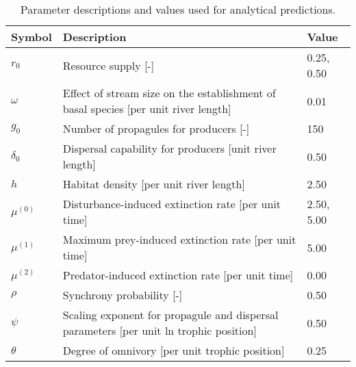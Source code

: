 \begin{table}[ht]
\centering
\caption{Parameter descriptions and values used for analytical predictions.} 
\label{tab:parms}
\begingroup\small
\begin{tabularx}{\textwidth}{lll}
  \hline
Symbol & Description & Value \\ 
  \hline
$r_0$ & Resource supply [-] & 0.25, 0.50 \\ 
  $\omega$ & Effect of stream size on the establishment of basal species [per unit river length] & 0.01 \\ 
  $g_0$ & Number of propagules for producers [-] & 150 \\ 
  $\delta_0$ & Dispersal capability for producers [unit river length] & 0.50 \\ 
  $h$ & Habitat density [per unit river length] & 2.50 \\ 
  $\mu^{(0)}$ & Disturbance-induced extinction rate [per unit time] & 2.50, 5.00 \\ 
  $\mu^{(1)}$ & Maximum prey-induced extinction rate [per unit time] & 5.00 \\ 
  $\mu^{(2)}$ & Predator-induced extinction rate [per unit time] & 0.00 \\ 
  $\rho$ & Synchrony probability [-] & 0.50 \\ 
  $\psi$ & Scaling exponent for propagule and dispersal parameters [per unit ln trophic position] & 0.50 \\ 
  $\theta$ & Degree of omnivory [per unit trophic position] & 0.25 \\ 
   \hline
\end{tabularx}
\endgroup
\end{table}
